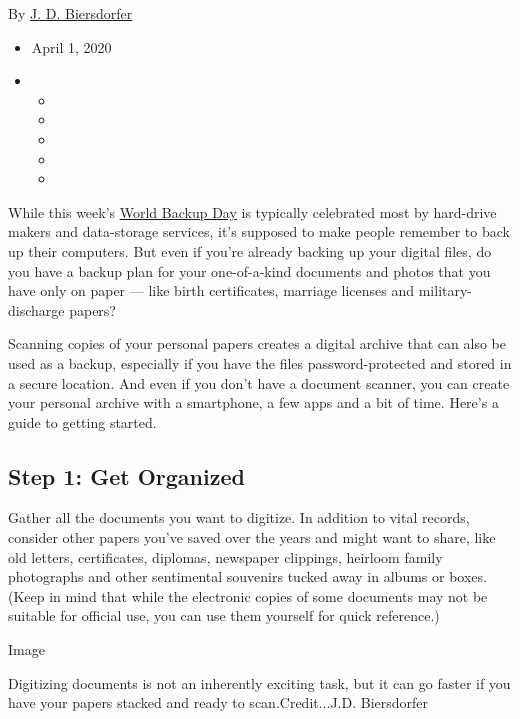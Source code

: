 By \href{https://www.nytimes3xbfgragh.onion/by/j-d-biersdorfer}{J. D.
Biersdorfer}

\begin{itemize}
\item
  April 1, 2020
\item
  \begin{itemize}
  \item
  \item
  \item
  \item
  \item
  \end{itemize}
\end{itemize}

While this week's \href{http://www.worldbackupday.com/en/}{World Backup
Day} is typically celebrated most by hard-drive makers and data-storage
services, it's supposed to make people remember to back up their
computers. But even if you're already backing up your digital files, do
you have a backup plan for your one-of-a-kind documents and photos that
you have only on paper --- like birth certificates, marriage licenses
and military-discharge papers?

Scanning copies of your personal papers creates a digital archive that
can also be used as a backup, especially if you have the files
password-protected and stored in a secure location. And even if you
don't have a document scanner, you can create your personal archive with
a smartphone, a few apps and a bit of time. Here's a guide to getting
started.

\hypertarget{step-1-get-organized}{%
\subsection{Step 1: Get Organized}\label{step-1-get-organized}}

Gather all the documents you want to digitize. In addition to vital
records, consider other papers you've saved over the years and might
want to share, like old letters, certificates, diplomas, newspaper
clippings, heirloom family photographs and other sentimental souvenirs
tucked away in albums or boxes. (Keep in mind that while the electronic
copies of some documents may not be suitable for official use, you can
use them yourself for quick reference.)

Image

Digitizing documents is not an inherently exciting task, but it can go
faster if you have your papers stacked and ready to scan.Credit...J.D.
Biersdorfer

